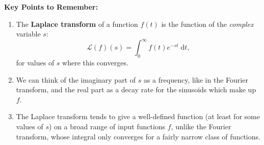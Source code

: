 \documentclass{article}
\newcommand{\diff}{\;\mathrm{d}}
\begin{document}
\clearpage




{\bf Key Points to Remember:}

\vspace{5mm}

\begin{enumerate}
	\item The \textbf{Laplace transform} of a function $f(t)$ is the function of the \textit{complex} variable $s$:
		\[\mathcal{L}(f)(s)=\int_{0}^\infty f(t)e^{-st}\diff t,\]
		for values of $s$ where this converges.
	\item We can think of the imaginary part of $s$ as a frequency, like in the Fourier transform, and the real part as a decay rate for the sinusoids which make up $f$.
	\item The Laplace transform tends to give a well-defined function (at least for some values of $s$) on a broad range of input functions $f$, unlike the Fourier transform, whose integral only converges for a fairly narrow class of functions.
\end{enumerate}
\end{document}
